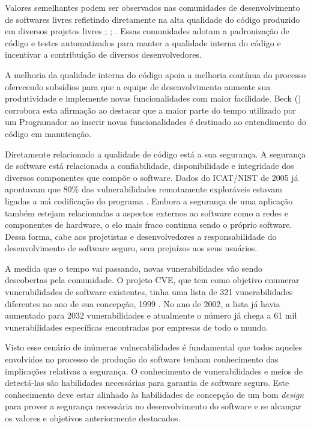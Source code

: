 %

Valores semelhantes podem ser observados nas comunidades de desenvolvimento de softwares livres refletindo diretamente na alta qualidade do código produzido em diversos projetos livres \cite{schmidt2001}; \cite{halloran2002}; \cite{michlmayr2003}. Essas comunidades adotam a padronização de código e testes automatizados para manter a qualidade interna do código e incentivar a contribuição de diversos desenvolvedores.

%

A melhoria da qualidade interna do código apoia a melhoria contínua do processo oferecendo subsídios para que a equipe de desenvolvimento aumente sua produtividade e implemente novas funcionalidades com maior facilidade. Beck (\citeyear{beck2007}) corrobora esta afirmação ao destacar que a maior parte do tempo utilizado por um Programador ao inserir novas funcionalidades é destinado ao entendimento do código em manutenção. 

%

Diretamente relacionado a qualidade de código está a sua segurança\cite{tsipenyuk2005}. A segurança de software está relacionada a confiabilidade, disponibilidade e integridade dos diversos componentes que compõe o software. Dados do ICAT/NIST de 2005 já apontavam que 80\% das vulnerabilidades remotamente exploráveis estavam ligadas a má codificação do programa \cite{duarte2005}. Embora a segurança de uma aplicação também estejam relacionadas a aspectos externos ao software como a redes e componentes de hardware, o elo mais fraco continua sendo o próprio software. Dessa forma, cabe aos projetistas e desenvolvedores a responsabilidade do desenvolvimento de software seguro, sem prejuízos aos seus usuários.

%

A medida que o tempo vai passando, novas vunerabilidades vão sendo descobertas pela comunidade. O projeto CVE, que tem como objetivo enumerar vunerabilidades de software existentes, tinha uma lista de 321 vunerabilidades diferentes no ano de sua concepção, 1999 \cite{cve2002}. No ano de 2002, a lista já havia aumentado para 2032 vunerabilidades e atualmente o número já chega a 61 mil vunerabilidades específicas encontradas por empresas de todo o mundo.

%

Visto esse cenário de inúmeras vulnerabilidades é fundamental que todos aqueles envolvidos no processo de produção do software tenham conhecimento das implicações relativas a segurança. O conhecimento de vunerabilidades e meios de detectá-las são habilidades necessárias para garantia de software seguro. Este conhecimento deve estar alinhado às habilidades de concepção de um bom \emph{design} para prover a segurança necessária no desenvolvimento do software e se alcançar os valores e objetivos anteriormente destacados.

